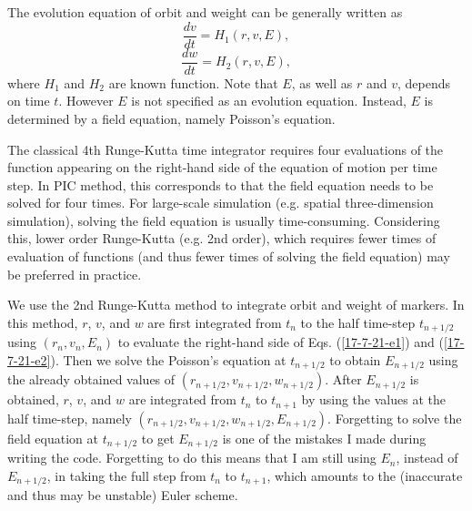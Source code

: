 \documentclass{article}
\begin{document}
The evolution equation of orbit and weight can be generally written as
\begin{equation}
  \label{17-7-21-e1} \frac{d v}{d t} = H_1 (r, v, E),
\end{equation}
\begin{equation}
  \label{17-7-21-e2} \frac{d w}{d t} = H_2 (r, v, E),
\end{equation}
where $H_1$ and $H_2$ are known function. Note that $E$, as well as $r$ and
$v$, depends on time $t$. However $E$ is not specified as an evolution
equation. Instead, $E$ is determined by a field equation, namely Poisson's
equation.

The classical 4th Runge-Kutta time integrator requires four evaluations of
the function appearing on the right-hand side of the equation of motion per
time step. In PIC method, this corresponds to that the field equation needs to
be solved for four times. For large-scale simulation (e.g. spatial
three-dimension simulation), solving the field equation is usually
time-consuming. Considering this, lower order Runge-Kutta (e.g. 2nd order),
which requires fewer times of evaluation of functions (and thus fewer times of
solving the field equation) may be preferred in practice.

We use the 2nd Runge-Kutta method to integrate orbit and weight of markers. In
this method, $r$, $v$, and $w$ are first integrated from $t_n$ to the half
time-step $t_{n + 1 / 2}$ using $(r_n, v_n, E_n)$ to evaluate the right-hand
side of Eqs. (\ref{17-7-21-e1}) and (\ref{17-7-21-e2}). Then we solve the
Poisson's equation at $t_{n + 1 / 2}$ to obtain $E_{n + 1 / 2}$ using the
already obtained values of $(r_{n + 1 / 2}, v_{n + 1 / 2}, w_{n + 1 / 2})$.
After $E_{n + 1 / 2}$ is obtained, $r$, $v$, and $w$ are integrated from $t_n$
to $t_{n + 1}$ by using the values at the half time-step, namely $(r_{n + 1 /
2}, v_{n + 1 / 2}, w_{n + 1 / 2}, E_{n + 1 / 2})$. Forgetting to solve the
field equation at $t_{n + 1 / 2}$ to get $E_{n + 1 / 2}$ is one of the
mistakes I made during writing the code. Forgetting to do this means that I am
still using $E_n$, instead of $E_{n + 1 / 2}$, in taking the full step from
$t_n$ to $t_{n + 1}$, which amounts to the (inaccurate and thus may be
unstable) Euler scheme.
\end{document}
